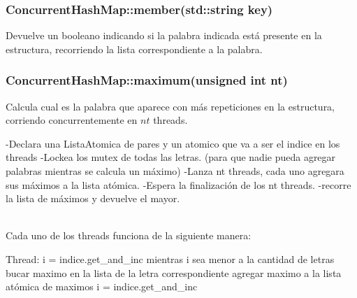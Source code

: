 \subsubsection{ConcurrentHashMap::member(std::string key)}
Devuelve un booleano indicando si la palabra indicada está presente en la estructura, recorriendo la lista correspondiente a la palabra.

\subsubsection{ConcurrentHashMap::maximum(unsigned int nt)}
Calcula cual es la palabra que aparece con más repeticiones en la estructura, corriendo concurrentemente en $nt$ threads.\\
\begin{codesnippet}
 	-Declara una ListaAtomica de pares y un atomico que va a ser el indice en los threads
 	-Lockea los mutex de todas las letras.
 	(para que nadie pueda agregar palabras mientras se calcula un máximo)
 	-Lanza nt threads, cada uno agregara sus máximos a la lista atómica.
 	-Espera la finalización de los nt threads.
 	-recorre la lista de máximos y devuelve el mayor.
\end{codesnippet}\\
Cada uno de los threads funciona de la siguiente manera:\\
\begin{codesnippet}
 	Thread:
 		i = indice.get_and_inc
 		mientras i sea menor a la cantidad de letras
 			bucar maximo en la lista de la letra correspondiente
 			agregar maximo a la lista atómica de maximos
 			i = indice.get_and_inc

\end{codesnippet}\\
